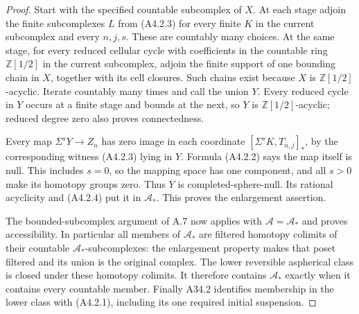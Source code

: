 \begin{proof}
Start with the specified countable subcomplex of $X$.  At each stage
adjoin the finite subcomplexes $L$ from \textup{(A4.2.3)} for every
finite $K$ in the current subcomplex and every $n,j,s$.  These are
countably many choices.  At the same stage, for every reduced cellular
cycle with coefficients in the countable ring $\mathbb Z[1/2]$ in
the current subcomplex, adjoin the finite support of one bounding
chain in $X$, together with its cell closures.  Such chains exist
because $X$ is $\mathbb Z[1/2]$-acyclic.  Iterate countably many times
and call the union $Y$.  Every reduced cycle in $Y$ occurs at a finite
stage and bounds at the next, so $Y$ is $\mathbb Z[1/2]$-acyclic;
reduced degree zero also proves connectedness.

Every map $\Sigma^sY\to Z_n$ has zero image in each coordinate
$[\Sigma^sK,T_{n,j}]_*$, by the corresponding witness
\textup{(A4.2.3)} lying in $Y$.  Formula \textup{(A4.2.2)} says the
map itself is null.  This includes $s=0$, so the mapping space has
one component, and all $s>0$ make its homotopy groups zero.  Thus
$Y$ is completed-sphere-null.  Its rational acyclicity and
\textup{(A4.2.4)} put it in $\mathcal A_*$.  This proves the
enlargement assertion.

The bounded-subcomplex argument of A.7 now applies with
$\mathcal A=\mathcal A_*$ and proves accessibility.  In particular
all members of $\mathcal A_*$ are filtered homotopy colimits of
their countable $\mathcal A_*$-subcomplexes: the enlargement property
makes that poset filtered and its union is the original complex.
The lower reversible aspherical class is closed under these
homotopy colimits.  It therefore contains $\mathcal A_*$ exactly
when it contains every countable member.  Finally A34.2 identifies
membership in the lower class with \textup{(A4.2.1)}, including its
one required initial suspension.
\end{proof}
